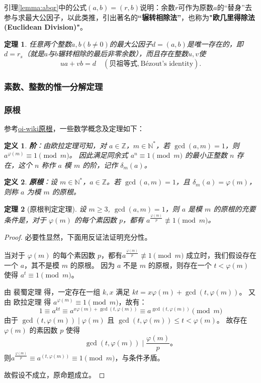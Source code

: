 \documentclass[10pt]{ctexart}
\newtheorem{definition}{定义}
\newtheorem{theorem}{定理}
\begin{document}
引理\ref{lemma:abqr}中的公式$(a,b)=(r,b)$说明：余数$r$可作为原数$a$的“替身”去参与求最大公因子，以此类推，引出著名的\textbf{“辗转相除法”}，也称为\textbf{"欧几里得除法(Euclidean Division)"}。

\begin{theorem}
	任意两个整数$a,b(b \neq 0)$的最大公因子$d = (a,b)$是唯一存在的，即$d = r_s$（就是$a$与$b$辗转相除的最后非零余数），而且存在整数$u,v$使
	$$
	ua + vb = d \quad(\textbf{贝祖等式},\text{B\'ezout's identity}).
	$$
\end{theorem}

\subsubsection{素数、整数的惟一分解定理}
\subsubsection{原根}
参考\href{https://oi-wiki.org/math/number-theory/primitive-root/#%E5%8E%9F%E6%A0%B9}{oi-wiki原根}，一些数学概念及定理如下：
\begin{definition}
	\textbf{阶}：由欧拉定理可知，对 $a\in \mathbb{Z}$，$m\in\mathbb{N}^{*}$，若 $\gcd(a,m)=1$，则 $a^{\varphi(m)}\equiv 1\pmod m$。
	因此满足同余式 $a^n \equiv 1 \pmod m$ 的最小正整数 $n$ 存在，这个 $n$ 称作 $a$ 模 $m$ 的阶，记作 $\delta_m(a)$。
\end{definition}

\begin{definition}
	\textbf{原根}：设 $m \in \mathbb{N}^{*}$，$a\in \mathbb{Z}$。若 $\gcd(a,m)=1$，且 $\delta_m(a)=\varphi(m)$，则称 $a$ 为模 $m$ 的原根。
\end{definition}

\begin{theorem}[原根判定定理]
	设 $m \geqslant 3$, $\gcd(a,m)=1$，则 $a$ 是模 $m$ 的原根的充要条件是，对于 $\varphi(m)$ 的每个素因数 $p$，都有 $a^{\frac{\varphi(m)}{p}}\not\equiv 1\pmod m$。
\end{theorem}
\begin{proof}
	必要性显然，下面用反证法证明充分性。

	当对于 $\varphi(m)$ 的每个素因数 $p$，都有$a^{\frac{\varphi(m)}{p}}\not\equiv 1\pmod m$ 成立时，我们假设存在一个 $a$，其不是模 $m$ 的原根。
	因为 $a$ 不是 $m$ 的原根，则存在一个 $t<\varphi(m)$ 使得 $a^t\equiv 1\pmod{m}$。

	由 裴蜀定理 得，一定存在一组 $k,x$ 满足 $kt=x\varphi(m)+\gcd(t,\varphi(m))$。
	又由 欧拉定理 得 $a^{\varphi(m)}\equiv 1\pmod{m}$，故有：
	$$
	1\equiv a^{kt}\equiv a^{x\varphi(m)+\gcd(t,\varphi(m))}\equiv a^{\gcd(t,\varphi(m))}\pmod{m}
	$$
	由于 $\gcd(t, \varphi(m)) \mid \varphi(m)$ 且 $\gcd(t, \varphi(m))\leqslant t < \varphi(m)$。
	故存在 $\varphi(m)$ 的素因数 $p$ 使得 
	$$ 
	\gcd(t, \varphi(m)) \mid \frac{\varphi(m)}{p}。
	$$
	则$a^{\frac{\varphi(m)}{p}}\equiv a^{(t, \varphi(m))}\equiv 1\pmod{m}$，与条件矛盾。

	故假设不成立，原命题成立。
\end{proof}
\end{document}
